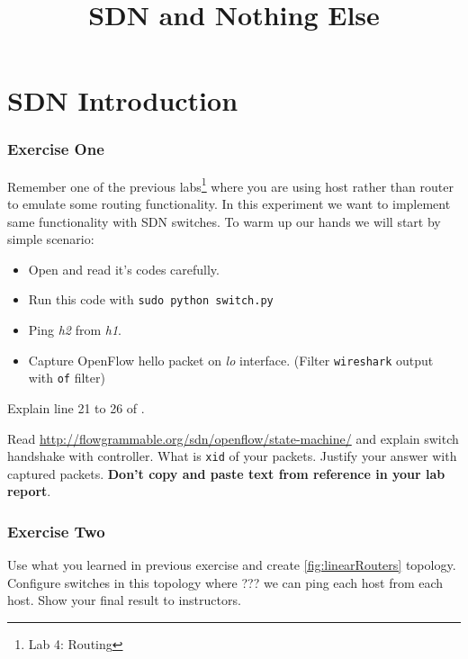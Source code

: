 \documentclass{../UTNetLab}
\title{SDN and Nothing Else}
\begin{document}
\part{SDN Introduction}
    \section{Exercise One}
    Remember one of the previous labs\footnote{Lab 4: Routing} where you are using host rather than router to emulate some routing functionality. In this experiment we want to implement same functionality with SDN switches. To warm up our hands we will start by simple scenario:

    \begin{itemize}
        \item Open  and read it's codes carefully.
        \item Run this code with \lstinline{sudo python switch.py}
        \item Ping \textit{h2} from \textit{h1}.
        \item Capture OpenFlow hello packet on \textit{lo} interface. (Filter \lstinline{wireshark} output with \lstinline{of} filter)
    \end{itemize}

    \begin{report}
        \item Explain line 21 to 26 of .
        \item Read \url{http://flowgrammable.org/sdn/openflow/state-machine/} and explain switch handshake with controller. What is \texttt{xid} of your packets. Justify your answer with captured packets. \textbf{Don't copy and paste text from reference in your lab report}.
    \end{report}

    \section{Exercise Two}
    Use what you learned in previous exercise and create \autoref{fig:linearRouters} topology. Configure switches in this topology where ??? we can ping each host from each host. Show your final result to instructors.
\end{document}
